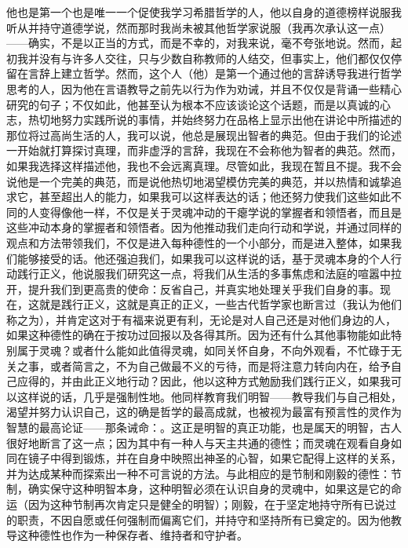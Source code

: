 他也是第一个也是唯一一个促使我学习希腊哲学的人，他以自身的道德榜样说服我听从并持守道德学说，然而那时我尚未被其他哲学家说服（我再次承认这一点）——确实，不是以正当的方式，而是不幸的，对我来说，毫不夸张地说。然而，起初我并没有与许多人交往，只与少数自称教师的人结交，但事实上，他们都仅仅停留在言辞上建立哲学。然而，这个人（他）是第一个通过他的言辞诱导我进行哲学思考的人，因为他在言语教导之前先以行为作为劝诫，并且不仅仅是背诵一些精心研究的句子；不仅如此，他甚至认为根本不应该谈论这个话题，而是以真诚的心志，热切地努力实践所说的事情，并始终努力在品格上显示出他在讲论中所描述的那位将过高尚生活的人，我可以说，他总是展现出智者的典范。但由于我们的论述一开始就打算探讨真理，而非虚浮的言辞，我现在不会称他为智者的典范。然而，如果我选择这样描述他，我也不会远离真理。尽管如此，我现在暂且不提。我不会说他是一个完美的典范，而是说他热切地渴望模仿完美的典范，并以热情和诚挚追求它，甚至超出人的能力，如果我可以这样表达的话；他还努力使我们这些如此不同的人变得像他一样，不仅是关于灵魂冲动的干瘪学说的掌握者和领悟者，而且是这些冲动本身的掌握者和领悟者。因为他推动我们走向行动和学说，并通过同样的观点和方法带领我们，不仅是进入每种德性的一个小部分，而是进入整体，如果我们能够接受的话。他还强迫我们，如果我可以这样说的话，基于灵魂本身的个人行动践行正义，他说服我们研究这一点，将我们从生活的多事焦虑和法庭的喧嚣中拉开，提升我们到更高贵的使命：反省自己，并真实地处理关乎我们自身的事。现在，这就是践行正义，这就是真正的正义，一些古代哲学家也断言过（我认为他们称之为），并肯定这对于有福来说更有利，无论是对人自己还是对他们身边的人，如果这种德性的确在于按功过回报以及各得其所。因为还有什么其他事物能如此特别属于灵魂？或者什么能如此值得灵魂，如同关怀自身，不向外观看，不忙碌于无关之事，或者简言之，不为自己做最不义的亏待，而是将注意力转向内在，给予自己应得的，并由此正义地行动？因此，他以这种方式勉励我们践行正义，如果我可以这样说的话，几乎是强制性地。他同样教育我们明智——教导我们与自己相处，渴望并努力认识自己，这的确是哲学的最高成就，也被视为最富有预言性的灵作为智慧的最高论证——那条诫命：。这正是明智的真正功能，也是属天的明智，古人很好地断言了这一点；因为其中有一种人与天主共通的德性；而灵魂在观看自身如同在镜子中得到锻炼，并在自身中映照出神圣的心智，如果它配得上这样的关系，并为达成某种而探索出一种不可言说的方法。与此相应的是节制和刚毅的德性：节制，确实保守这种明智本身，这种明智必须在认识自身的灵魂中，如果这是它的命运（因为这种节制再次肯定只是健全的明智）；刚毅，在于坚定地持守所有已说过的职责，不因自愿或任何强制而偏离它们，并持守和坚持所有已奠定的。因为他教导这种德性也作为一种保存者、维持者和守护者。\par

